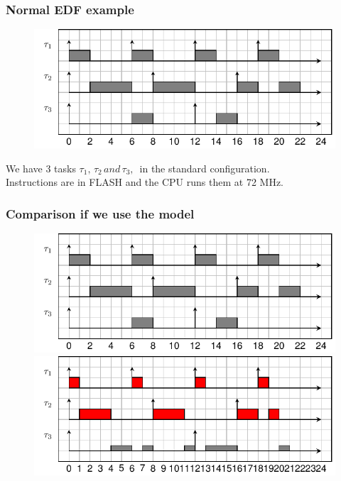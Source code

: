 \documentclass[
	11pt, %
]{beamer}
\begin{document}
\begin{frame}[fragile]
	\frametitle{ Normal EDF example }
	\begin{figure}
		\includegraphics{schedule/edf.pdf}
	\end{figure}
	We have 3 tasks $\tau_1,\,\tau_2\, and \,\tau_3,\,$ in the standard configuration. \\
	Instructions are in FLASH and the CPU runs them at 72 MHz.
\end{frame}

\begin{frame}[fragile]
	\frametitle{ Comparison if we use the model  }
	\begin{figure}
		\includegraphics[scale=0.8]{schedule/edf.pdf}
		\includegraphics[scale=0.8]{schedule/offline_algo.pdf}
	\end{figure}

\end{frame}

%
\end{document}
